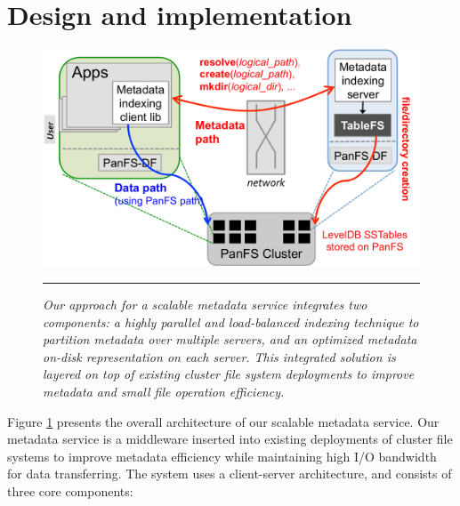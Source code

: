 \section{Design and implementation}

\begin{figure}[t]   %
\centerline{\includegraphics[scale=0.4]{./figs/giga-impl-leveldb-clusterfs}}
\vspace{10pt}
\caption{\textit{
Our approach for a scalable metadata service integrates two components: a highly
parallel and load-balanced indexing technique \cite{GIGA11}
to partition metadata over multiple servers,
and an optimized metadata on-disk representation \cite{TableFS} on each server.
This integrated solution is layered on top of existing cluster
file system deployments to improve metadata and small file operation efficiency.
}}
\vspace{10pt}
\hrule
\label{fig:design}
\end{figure}       %

Figure \ref{fig:design} presents the overall architecture of our scalable
metadata service. Our metadata service is a middleware inserted into
existing deployments of cluster file systems to improve metadata efficiency
while maintaining high I/O bandwidth for data transferring.
The system uses a client-server architecture,
and consists of three core components:

